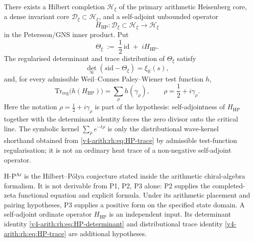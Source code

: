 \begin{hypothesis}
\label{v4-arith:rh:hyp:HPAr}
There exists a Hilbert completion \(\mathcal H_{\xi}\) of the primary
arithmetic Heisenberg core, a dense invariant core
\(\mathcal D_{\xi}\subset\mathcal H_{\xi}\), and a self-adjoint
unbounded operator
\[
H_{\mathrm{HP}}:\mathcal D_{\xi}\subset\mathcal H_{\xi}\longrightarrow
\mathcal H_{\xi}
\]
in the Petersson/GNS inner product. Put
\begin{equation}
\label{v4-arith:rh:def:ThetaXi}
\Theta_{\xi}\;:=\;\frac{1}{2}\,\mathrm{id}\;+\;iH_{\mathrm{HP}}.
\end{equation}
The regularised determinant and trace distribution of
\(\Theta_{\xi}\) satisfy
\begin{equation}
\label{v4-arith:rh:eq:HP-determinant}
\det_{\infty}(s\mathrm{id}-\Theta_{\xi})=\xi_{\mathbb R}(s),
\end{equation}
and, for every admissible Weil--Connes Paley--Wiener test function
\(h\),
\begin{equation}
\label{v4-arith:rh:eq:HP-trace}
\mathrm{Tr}_{\mathrm{reg}}\bigl(h(H_{\mathrm{HP}})\bigr)
=\sum_{\rho}h(\gamma_{\rho}),
\qquad \rho=\frac12+i\gamma_{\rho}.
\end{equation}
Here the notation \(\rho=\tfrac12+i\gamma_{\rho}\) is part of the
hypothesis: self-adjointness of \(H_{\mathrm{HP}}\) together with the
determinant identity forces the zero divisor onto the critical line.
The symbolic kernel \(\sum_{\rho}e^{-t\rho}\) is only the
distributional wave-kernel shorthand obtained from
\eqref{v4-arith:rh:eq:HP-trace} by admissible test-function
regularisation; it is not an ordinary heat trace of a non-negative
self-adjoint operator.
\end{hypothesis}

\begin{remark}
\label{v4-arith:rh:rem:HPAr-form}
H-P\(^{\mathrm{Ar}}\) is the Hilbert--P\'olya conjecture stated
inside the arithmetic chiral-algebra formalism. It is not
derivable from P1, P2, P3 alone: P2 supplies the completed-zeta
functional equation and explicit formula. Under its arithmetic
placement and pairing hypotheses, P3 supplies a positive form on
the specified state domain. A self-adjoint ordinate operator
\(H_{\mathrm{HP}}\) is an independent input. Its determinant identity
\eqref{v4-arith:rh:eq:HP-determinant} and distributional trace identity
\eqref{v4-arith:rh:eq:HP-trace} are additional hypotheses.
\end{remark}

